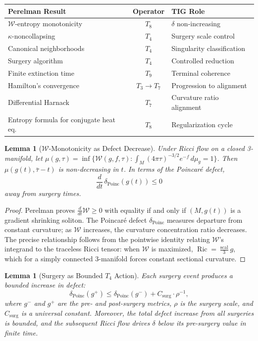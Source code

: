 \documentclass[11pt]{article}
\newtheorem{lemma}[theorem]{Lemma}
\DeclareMathOperator{\Ric}{Ric}
\DeclareMathOperator{\scal}{scal}
\begin{document}
\begin{center}
\begin{tabular}{@{}p{5.5cm}cl@{}}
\toprule
Perelman Result & Operator & TIG Role \\
\midrule
$\mathcal{W}$-entropy monotonicity \cite{Per1} & $T_8$ & $\delta$ non-increasing \\
$\kappa$-noncollapsing \cite{Per1} & $T_4$ & Surgery scale control \\
Canonical neighborhoods \cite{Per2} & $T_4$ & Singularity classification \\
Surgery algorithm \cite{Per2} & $T_4$ & Controlled reduction \\
Finite extinction time \cite{Per3} & $T_9$ & Terminal coherence \\
Hamilton's convergence \cite{Ham82} & $T_3 \to T_7$ & Progression to alignment \\
Differential Harnack \cite{Per1} & $T_7$ & Curvature ratio alignment \\
Entropy formula for conjugate heat eq. & $T_8$ & Regularization cycle \\
\bottomrule
\end{tabular}
\end{center}

\begin{lemma}[$\mathcal{W}$-Monotonicity as Defect Decrease]
\label{lem:W-mono}
Under Ricci flow on a closed 3-manifold, let
$\mu(g,\tau) = \inf\{\mathcal{W}(g,f,\tau) :
\int_M (4\pi\tau)^{-3/2} e^{-f}\, d\mu_g = 1\}$.
Then $\mu(g(t), \bar\tau - t)$ is non-decreasing in $t$.
In terms of the Poincar\'e defect,
\[
\frac{d}{dt}\, \delta_{\mathrm{Poinc}}(g(t)) \leq 0
\]
away from surgery times.
\end{lemma}

\begin{proof}
Perelman \cite{Per1} proves $\frac{d}{dt}\mathcal{W} \geq 0$ with
equality if and only if $(M, g(t))$ is a gradient shrinking soliton.
The Poincar\'e defect $\delta_{\mathrm{Poinc}}$ measures departure from
constant curvature; as $\mathcal{W}$ increases, the curvature
concentration ratio decreases.  The precise relationship follows
from the pointwise identity relating $\mathcal{W}$'s integrand to the
traceless Ricci tensor: when $\mathcal{W}$ is maximized,
$\Ric = \frac{\scal}{3} g$, which for a simply connected 3-manifold
forces constant sectional curvature.
\end{proof}

\begin{lemma}[Surgery as Bounded $T_4$ Action]
\label{lem:surgery}
Each surgery event produces a bounded increase in defect:
\[
\delta_{\mathrm{Poinc}}(g^+) \leq \delta_{\mathrm{Poinc}}(g^-)
+ C_{\mathrm{surg}} \cdot \rho^{-1},
\]
where $g^-$ and $g^+$ are the pre- and post-surgery metrics,
$\rho$ is the surgery scale, and $C_{\mathrm{surg}}$ is a universal
constant.  Moreover, the total defect increase from all surgeries is
bounded, and the subsequent Ricci flow drives $\delta$ below its
pre-surgery value in finite time.
\end{lemma}
\end{document}
